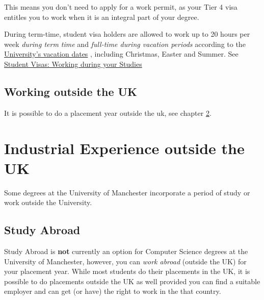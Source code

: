 \documentclass[
]{book}
\begin{document}
This means you don't need to apply for a work permit, as your Tier 4 visa entitles you to work when it is an integral part of your degree.

During term-time, student visa holders are allowed to work up to 20 hours per week \emph{during term time} and \emph{full-time during vacation periods} according to the \href{https://www.manchester.ac.uk/discover/key-dates}{University's vacation dates} \citep{keydates}, including Christmas, Easter and Summer. See \href{https://www.studentsupport.manchester.ac.uk/immigration-and-visas/working/working-during-your-studies/}{Student Visas: Working during your Studies} \citep{workingduringstudy}

\section{Working outside the UK}\label{working-outside-the-uk}

It is possible to do a placement year outside the uk, see chapter \ref{notuk}.

\chapter{Industrial Experience outside the UK}\label{notuk}

Some degrees at the University of Manchester incorporate a period of study or work outside the University. \citep{studyabroad}

\section{Study Abroad}\label{abroad}

Study Abroad is \textbf{not} currently an option for Computer Science degrees at the University of Manchester, however, you can \emph{work abroad} (outside the UK) for your placement year. While most students do their placements in the UK, it is possible to do placements outside the UK as well provided you can find a suitable employer and can get (or have) the right to work in the that country.
\end{document}
